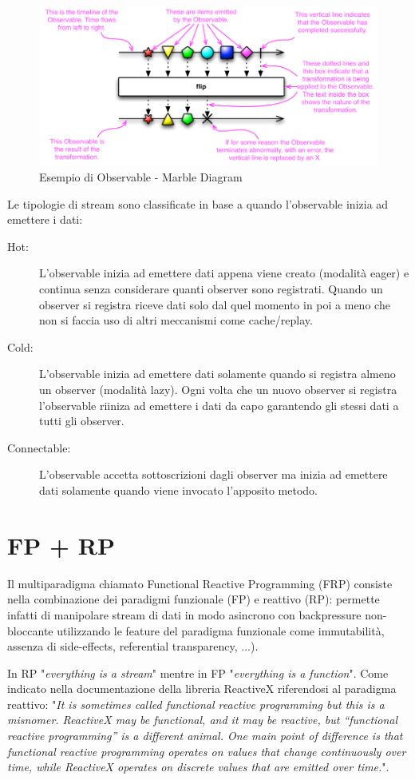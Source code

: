 \documentclass[../main.tex]{subfiles}
\begin{document}
\begin{figure}[H]
\centering
\includegraphics[width=1\textwidth]{img/observable1.png}
\caption{Esempio di Observable - Marble Diagram}
\end{figure}

Le tipologie di stream sono classificate in base a quando l'observable inizia ad emettere i dati:
\begin{description}
    \item[Hot:] L'observable inizia ad emettere dati appena viene creato (modalità eager) e continua senza considerare quanti observer sono registrati. Quando un observer si registra riceve dati solo dal quel momento in poi a meno che non si faccia uso di altri meccanismi come cache/replay.
    \item[Cold:] L'observable inizia ad emettere dati solamente quando si registra almeno un observer (modalità lazy). Ogni volta che un nuovo observer si registra l'observable riiniza ad emettere i dati da capo garantendo gli stessi dati a tutti gli observer.
    \item[Connectable:] L'observable accetta sottoscrizioni dagli observer ma inizia ad emettere dati solamente quando viene invocato l'apposito metodo.
\end{description}

\section{FP + RP}
Il multiparadigma chiamato Functional Reactive Programming (FRP) consiste nella combinazione dei paradigmi funzionale (FP) e reattivo (RP): permette infatti di manipolare stream di dati in modo asincrono con backpressure non-bloccante utilizzando le feature del paradigma funzionale come immutabilità, assenza di side-effects, referential transparency, ...).

In RP "\textit{everything is a stream}" mentre in FP "\textit{everything is a function}". Come indicato nella documentazione della libreria ReactiveX riferendosi al paradigma reattivo: "\textit{It is sometimes called functional reactive programming but this is a misnomer. ReactiveX may be functional, and it may be reactive, but “functional reactive programming” is a different animal. One main point of difference is that functional reactive programming operates on values that change continuously over time, while ReactiveX operates on discrete values that are emitted over time.}".
\end{document}
